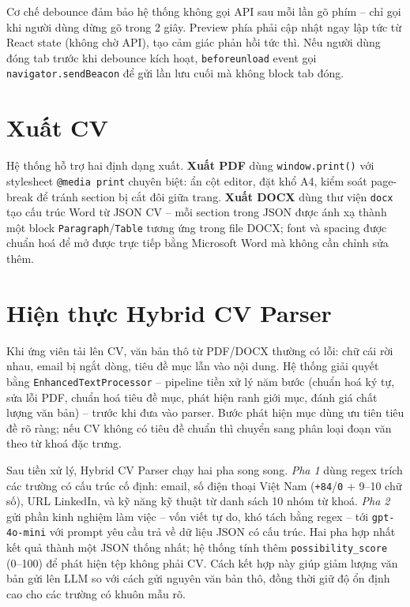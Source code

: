 \documentclass[../DoAn.tex]{subfiles}
\begin{document}
Cơ chế debounce đảm bảo hệ thống không gọi API sau mỗi lần gõ phím -- chỉ gọi khi người dùng dừng gõ trong 2 giây. Preview phía phải cập nhật ngay lập tức từ React state (không chờ API), tạo cảm giác phản hồi tức thì. Nếu người dùng đóng tab trước khi debounce kích hoạt, \texttt{beforeunload} event gọi \texttt{navigator.sendBeacon} để gửi lần lưu cuối mà không block tab đóng.

\section{Xuất CV}

Hệ thống hỗ trợ hai định dạng xuất. \textbf{Xuất PDF} dùng \texttt{window.print()} với stylesheet \texttt{@media print} chuyên biệt: ẩn cột editor, đặt khổ A4, kiểm soát page-break để tránh section bị cắt đôi giữa trang. \textbf{Xuất DOCX} dùng thư viện \texttt{docx} tạo cấu trúc Word từ JSON CV -- mỗi section trong JSON được ánh xạ thành một block \texttt{Paragraph}/\texttt{Table} tương ứng trong file DOCX; font và spacing được chuẩn hoá để mở được trực tiếp bằng Microsoft Word mà không cần chỉnh sửa thêm.

\section{Hiện thực Hybrid CV Parser}
\label{sec:hybrid_parser_impl}

Khi ứng viên tải lên CV, văn bản thô từ PDF/DOCX thường có lỗi: chữ cái rời nhau, email bị ngắt dòng, tiêu đề mục lẫn vào nội dung. Hệ thống giải quyết bằng \texttt{EnhancedTextProcessor} -- pipeline tiền xử lý năm bước (chuẩn hoá ký tự, sửa lỗi PDF, chuẩn hoá tiêu đề mục, phát hiện ranh giới mục, đánh giá chất lượng văn bản) -- trước khi đưa vào parser. Bước phát hiện mục dùng ưu tiên tiêu đề rõ ràng; nếu CV không có tiêu đề chuẩn thì chuyển sang phân loại đoạn văn theo từ khoá đặc trưng.

Sau tiền xử lý, Hybrid CV Parser chạy hai pha song song. \textit{Pha 1} dùng regex trích các trường có cấu trúc cố định: email, số điện thoại Việt Nam (\texttt{+84}/\texttt{0} + 9--10 chữ số), URL LinkedIn, và kỹ năng kỹ thuật từ danh sách 10 nhóm từ khoá. \textit{Pha 2} gửi phần kinh nghiệm làm việc -- vốn viết tự do, khó tách bằng regex -- tới \texttt{gpt-4o-mini} với prompt yêu cầu trả về dữ liệu JSON có cấu trúc. Hai pha hợp nhất kết quả thành một JSON thống nhất; hệ thống tính thêm \texttt{possibility\_score} (0--100) để phát hiện tệp không phải CV. Cách kết hợp này giúp giảm lượng văn bản gửi lên LLM so với cách gửi nguyên văn bản thô, đồng thời giữ độ ổn định cao cho các trường có khuôn mẫu rõ.
\end{document}
